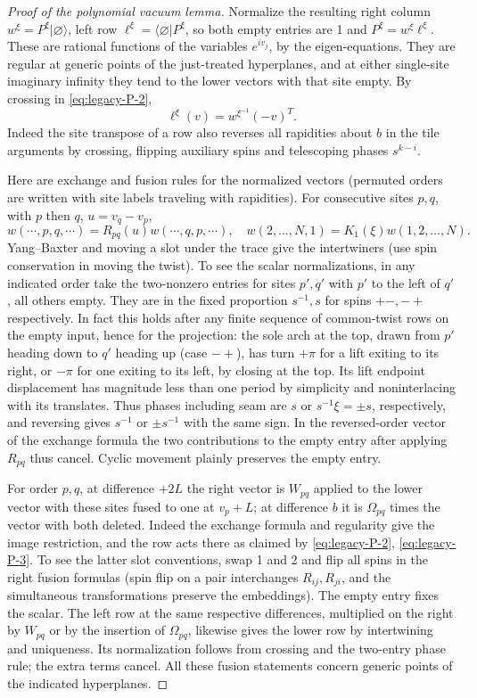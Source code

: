 \begin{proof}[Proof of the polynomial vacuum lemma]
Normalize the resulting right column \(w^\xi=P^\xi|\varnothing\rangle\), left row \(\ell^\xi=\langle\varnothing|P^\xi\), so both empty entries are 1 and \(P^\xi=w^\xi\ell^\xi\). These are rational functions of the variables \(e^{iv_j}\), by the eigen-equations. They are regular at generic points of the just-treated hyperplanes, and at either single-site imaginary infinity they tend to the lower vectors with that site empty. By crossing in \eqref{eq:legacy-P-2},
\[
 \ell^\xi(v)=w^{\xi^{-1}}(-v)^T.
\]
Indeed the site transpose of a row also reverses all rapidities about \(b\) in the tile arguments by crossing, flipping auxiliary spins and telescoping phases \(s^{k-i}\).

Here are exchange and fusion rules for the normalized vectors (permuted orders are written with site labels traveling with rapidities). For consecutive sites \(p,q\), with \(p\) then \(q\), \(u=v_q-v_p\),
\[
 w(\cdots,p,q,\cdots)=R_{pq}(u)w(\cdots,q,p,\cdots),\quad
 w(2,\ldots,N,1)=K_1(\xi)w(1,2,\ldots,N).
\]
Yang--Baxter and moving a slot under the trace give the intertwiners (use spin conservation in moving the twist). To see the scalar normalizations, in any indicated order take the two-nonzero entries for sites \(p',q'\) with \(p'\) to the left of \(q'\), all others empty. They are in the fixed proportion \(s^{-1},s\) for spins \(+-,-+\) respectively. In fact this holds after any finite sequence of common-twist rows on the empty input, hence for the projection: the sole arch at the top, drawn from \(p'\) heading down to \(q'\) heading up (case \(-+\)), has turn \(+\pi\) for a lift exiting to its right, or \(-\pi\) for one exiting to its left, by closing at the top. Its lift endpoint displacement has magnitude less than one period by simplicity and noninterlacing with its translates. Thus phases including seam are \(s\) or \(s^{-1}\xi=\pm s\), respectively, and reversing gives \(s^{-1}\) or \(\pm s^{-1}\) with the same sign. In the reversed-order vector of the exchange formula the two contributions to the empty entry after applying \(R_{pq}\) thus cancel. Cyclic movement plainly preserves the empty entry.

For order \(p,q\), at difference \(+2L\) the right vector is \(W_{pq}\) applied to the lower vector with these sites fused to one at \(v_p+L\); at difference \(b\) it is \(\Omega_{pq}\) times the vector with both deleted. Indeed the exchange formula and regularity give the image restriction, and the row acts there as claimed by \eqref{eq:legacy-P-2}, \eqref{eq:legacy-P-3}. To see the latter slot conventions, swap 1 and 2 and flip all spins in the right fusion formulas (spin flip on a pair interchanges \(R_{ij},R_{ji}\), and the simultaneous transformations preserve the embeddings). The empty entry fixes the scalar. The left row at the same respective differences, multiplied on the right by \(W_{pq}\) or by the insertion of \(\Omega_{pq}\), likewise gives the lower row by intertwining and uniqueness. Its normalization follows from crossing and the two-entry phase rule; the extra terms cancel. All these fusion statements concern generic points of the indicated hyperplanes.


\end{proof}
